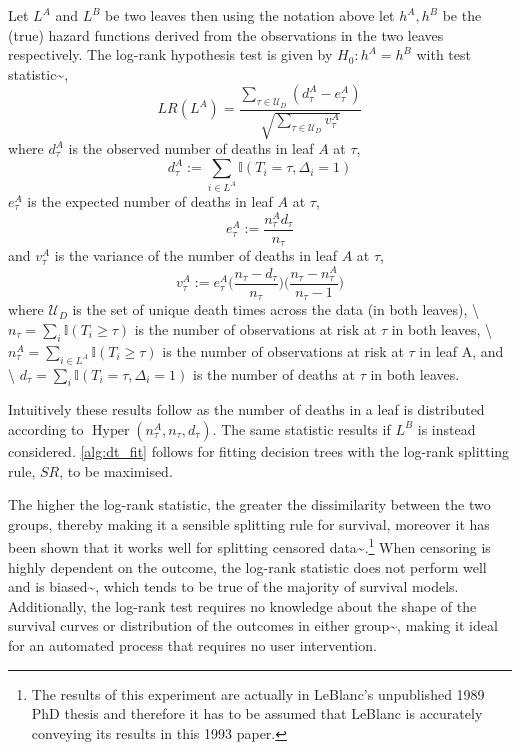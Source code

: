 \documentclass[
  letterpaper,
]{scrbook}
\theoremstyle{plain}
\theoremstyle{definition}
\theoremstyle{remark}
\begin{document}
Let \(L^A\) and \(L^B\) be two leaves then using the notation above let
\(h^A,h^B\) be the (true) hazard functions derived from the observations
in the two leaves respectively. The log-rank hypothesis test is given by
\(H_0: h^A = h^B\) with test statistic\textasciitilde{}\cite{Segal1988},
\[
LR(L^A) = \frac{\sum_{\tau \in \mathcal{U}_D} (d^A_{\tau} - e^A_{\tau})}{\sqrt{\sum_{\tau \in \mathcal{U}_D} v_\tau^A}}
\] where \(d^A_{\tau}\) is the observed number of deaths in leaf \(A\)
at \(\tau\), \[
d^A_{\tau} := \sum_{i \in L^A} \mathbb{I}(T_i = \tau, \Delta_i = 1)
\] \(e^A_{\tau}\) is the expected number of deaths in leaf \(A\) at
\(\tau\), \[
e^A_{\tau} := \frac{n_\tau^A d_\tau}{n_\tau}
\] and \(v^A_\tau\) is the variance of the number of deaths in leaf
\(A\) at \(\tau\), \[
v^A_{\tau} := e^A_{\tau} \Big(\frac{n_\tau - d_\tau}{n_\tau}\Big)\Big(\frac{n_\tau - n^A_\tau}{n_\tau - 1}\Big)
\] where \(\mathcal{U}_D\) is the set of unique death times across the
data (in both leaves), \textbackslash{}
\(n_\tau = \sum_i \mathbb{I}(T_i \geq \tau)\) is the number of
observations at risk at \(\tau\) in both leaves, \textbackslash{}
\(n_\tau^A = \sum_{i \in L^A} \mathbb{I}(T_i \geq \tau)\) is the number
of observations at risk at \(\tau\) in leaf A, and \textbackslash{}
\(d_\tau = \sum_i \mathbb{I}(T_i = \tau, \Delta_i = 1)\) is the number
of deaths at \(\tau\) in both leaves.

Intuitively these results follow as the number of deaths in a leaf is
distributed according to
\(\operatorname{Hyper}(n^A_\tau,n_\tau,d_\tau)\). The same statistic
results if \(L^B\) is instead considered. \ref{alg:dt_fit} follows for
fitting decision trees with the log-rank splitting rule, \(SR\), to be
maximised.

The higher the log-rank statistic, the greater the dissimilarity between
the two groups, thereby making it a sensible splitting rule for
survival, moreover it has been shown that it works well for splitting
censored
data\textasciitilde{}\cite{LeBlanc1993}.\footnote{The results of this experiment are actually in LeBlanc's unpublished 1989 PhD thesis and therefore it has to be assumed that LeBlanc is accurately conveying its results in this 1993 paper.}
When censoring is highly dependent on the outcome, the log-rank
statistic does not perform well and is
biased\textasciitilde{}\cite{Bland2004}, which tends to be true of the
majority of survival models. Additionally, the log-rank test requires no
knowledge about the shape of the survival curves or distribution of the
outcomes in either group\textasciitilde{}\cite{Bland2004}, making it
ideal for an automated process that requires no user intervention.
\end{document}
